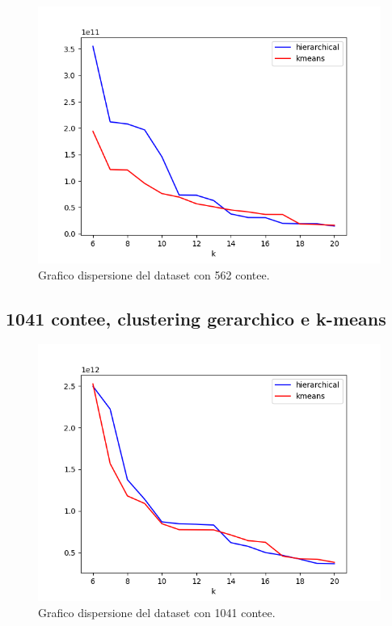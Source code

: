 \documentclass{article}
\begin{document}
\begin{figure}[H]
	\hspace*{-1cm}\begin{minipage}{0.55\linewidth}
		\centering
         
    \end{minipage}
        \begin{minipage}{0.7\linewidth}
            \includegraphics[width=1.0\linewidth, valign=t]{figures/output212}
			\caption*{Grafico dispersione del dataset con 562 contee.}
		\end{minipage}
\end{figure}
\subsection*{1041 contee, clustering gerarchico e k-means }
\begin{figure}[H]
	\hspace*{-1cm}\begin{minipage}{0.55\linewidth}
		\centering
			
	\end{minipage}
	\begin{minipage}{0.7\linewidth}
		\includegraphics[width=1.0\linewidth, valign=t]{figures/output1041}
		\caption*{Grafico dispersione del dataset con 1041 contee.}

	\end{minipage}
\end{figure}
\end{document}
